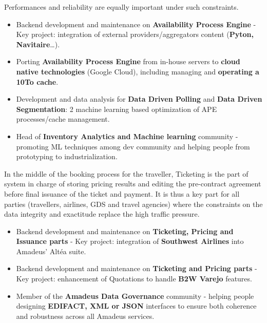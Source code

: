 \documentclass[10pt, a4paper, ragged2e]{altacv}
\begin{document}
		\medskip
		Performances and reliability are equally important under such constraints.

		\medskip
		\begin{itemize}
			\item Backend development and maintenance on \textbf{Availability Process Engine} - Key project: integration of external providers/aggregators content (\textbf{Pyton, Navitaire}\ldots).
			\item Porting \textbf{Availability Process Engine} from in-house servers to \textbf{cloud native technologies} (Google Cloud), including managing and \textbf{operating a 10To cache}.
			\item Development and data analysis for \textbf{Data Driven Polling} and \textbf{Data Driven Segmentation}: 2 machine learning based optimization of APE processes/cache management.
			\item Head of \textbf{Inventory Analytics and Machine learning} community - promoting ML techniques among dev community and helping people from prototyping to industrialization.
		\end{itemize}
	\divider


		In the middle of the booking process for the traveller, Ticketing is the part of system in charge of storing pricing results and editing the pre-contract agreement before final issuance of the ticket and payment. It is thus a key part for all parties (travellers, airlines, GDS and travel agencies) where the constraints on the data integrity and exactitude replace the high traffic pressure.

		\medskip
		\begin{itemize}
			\item Backend development and maintenance on \textbf{Ticketing, Pricing and Issuance parts} - Key project: integration of \textbf{Southwest Airlines} into Amadeus' Altéa suite.
			\item Backend development and maintenance on \textbf{Ticketing and Pricing parts} - Key project: enhancement of Quotations to handle \textbf{B2W Varejo} features.
			\item Member of the \textbf{Amadeus Data Governance} community - helping people designing \textbf{EDIFACT, XML or JSON} interfaces to ensure both coherence and robustness across all Amadeus services.
		\end{itemize}
	\divider
\end{document}
